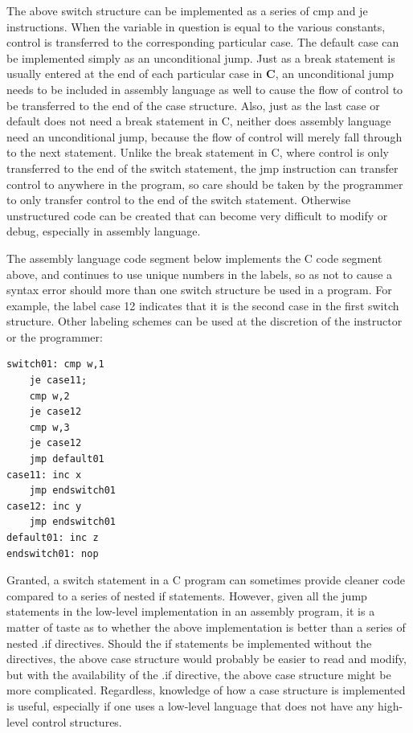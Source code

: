 \documentclass[10pt]{article}
\begin{document}
The above switch structure can be implemented as a series of cmp and je instructions. When the variable in question is equal to the various constants, control is transferred to the corresponding particular case. The default case can be implemented simply as an unconditional jump. Just as a break statement is usually entered at the end of each particular case in $\mathbf{C}$, an unconditional jump needs to be included in assembly language as well to cause the flow of control to be transferred to the end of the case structure. Also, just as the last case or default does not need a break statement in C, neither does assembly language need an unconditional jump, because the flow of control will merely fall through to the next statement. Unlike the break statement in C, where control is only transferred to the end of the switch statement, the jmp instruction can transfer control to anywhere in the program, so care should be taken by the programmer to only transfer control to the end of the switch statement. Otherwise unstructured code can be created that can become very difficult to modify or debug, especially in assembly language.

The assembly language code segment below implements the C code segment above, and continues to use unique numbers in the labels, so as not to cause a syntax error should more than one switch structure be used in a program. For\\
example, the label case 12 indicates that it is the second case in the first switch structure. Other labeling schemes can be used at the discretion of the instructor or the programmer:

\begin{verbatim}
switch01: cmp w,1
    je case11;
    cmp w,2
    je case12
    cmp w,3
    je case12
    jmp default01
case11: inc x
    jmp endswitch01
case12: inc y
    jmp endswitch01
default01: inc z
endswitch01: nop
\end{verbatim}

Granted, a switch statement in a C program can sometimes provide cleaner code compared to a series of nested if statements. However, given all the jump statements in the low-level implementation in an assembly program, it is a matter of taste as to whether the above implementation is better than a series of nested .if directives. Should the if statements be implemented without the directives, the above case structure would probably be easier to read and modify, but with the availability of the .if directive, the above case structure might be more complicated. Regardless, knowledge of how a case structure is implemented is useful, especially if one uses a low-level language that does not have any high-level control structures.
\end{document}
